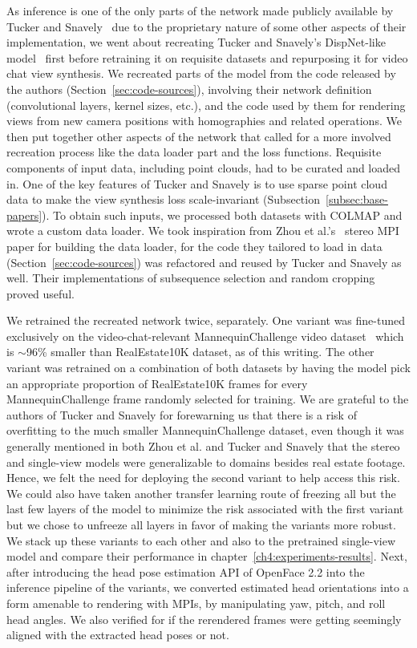 As inference is one of the only parts of the network made publicly available by Tucker and Snavely~\cite{single_view_mpi} due to the proprietary nature of some other aspects of their implementation, we went about recreating Tucker and Snavely's DispNet-like model~\cite{mayer_large_2016} first before retraining it on requisite datasets and repurposing it for video chat view synthesis. We recreated parts of the model from the code released by the authors (Section~\ref{sec:code-sources}), involving their network definition (convolutional layers, kernel sizes, etc.), and the code used by them for rendering views from new camera positions with homographies and related operations. We then put together other aspects of the network that called for a more involved recreation process like the data loader part and the loss functions. Requisite components of input data, including point clouds, had to be curated and loaded in. One of the key features of Tucker and Snavely is to use sparse point cloud data to make the view synthesis loss scale-invariant (Subsection~\ref{subsec:base-papers}). To obtain such inputs, we processed both datasets with COLMAP and wrote a custom data loader. We took inspiration from Zhou et al.'s~\cite{zhou2018stereo} stereo MPI paper for building the data loader, for the code they tailored to load in data (Section~\ref{sec:code-sources}) was refactored and reused by Tucker and Snavely as well. Their implementations of subsequence selection and random cropping proved useful.

We retrained the recreated network twice, separately. One variant was fine-tuned exclusively on the video-chat-relevant MannequinChallenge video dataset~\cite{li2019learning} which is $\sim$96\% smaller than RealEstate10K dataset, as of this writing. The other variant was retrained on a combination of both datasets by having the model pick an appropriate proportion of RealEstate10K frames for every MannequinChallenge frame randomly selected for training. We are grateful to the authors of Tucker and Snavely for forewarning us that there is a risk of overfitting to the much smaller MannequinChallenge dataset, even though it was generally mentioned in both Zhou et al. and Tucker and Snavely that the stereo and single-view models were generalizable to domains besides real estate footage. Hence, we felt the need for deploying the second variant to help access this risk. We could also have taken another transfer learning route of freezing all but the last few layers of the model to minimize the risk associated with the first variant but we chose to unfreeze all layers in favor of making the variants more robust. We stack up these variants to each other and also to the pretrained single-view model and compare their performance in chapter~\ref{ch4:experiments-results}. Next, after introducing the head pose estimation API of OpenFace 2.2 into the inference pipeline of the variants, we converted estimated head orientations into a form amenable to rendering with MPIs, by manipulating yaw, pitch, and roll head angles. We also verified for if the rerendered frames were getting seemingly aligned with the extracted head poses or not.

% 
% 

